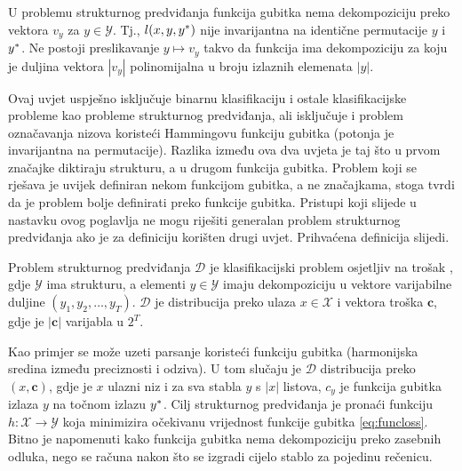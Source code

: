 \begin{condition}

  U problemu strukturnog predviđanja funkcija gubitka nema dekompoziciju preko
  vektora $v_y$ za $y \in \mathcal{Y}$. Tj., $l(x, y, y\ssymbol{1})$ nije
  invarijantna na identične permutacije $y$ i $y\ssymbol{1}$. Ne postoji
  preslikavanje $y \mapsto v_y$ takvo da funkcija ima dekompoziciju za koju je
  duljina vektora $|v_y|$ polinomijalna u broju izlaznih elemenata $|y|$.

\end{condition}

\noindent
Ovaj uvjet uspješno isključuje binarnu klasifikaciju i ostale klasifikacijske
probleme kao probleme strukturnog predviđanja, ali isključuje i problem
označavanja nizova koristeći Hammingovu funkciju gubitka (potonja je
invarijantna na permutacije). Razlika između ova dva uvjeta je taj što u prvom
značajke diktiraju strukturu, a u drugom funkcija gubitka. Problem koji se
rješava je uvijek definiran nekom funkcijom gubitka, a ne značajkama, stoga
\citeauthor{daume06thesis} tvrdi da je problem bolje definirati preko funkcije
gubitka. Pristupi koji slijede u nastavku ovog poglavlja ne mogu riješiti
generalan problem strukturnog predviđanja ako je za definiciju korišten drugi
uvjet. Prihvaćena definicija slijedi.

\begin{definition} \label{def:jointlearn}

  Problem strukturnog predviđanja $\mathcal{D}$ je klasifikacijski problem
  osjetljiv na trošak , gdje
  $\mathcal{Y}$ ima strukturu, a elementi $y \in \mathcal{Y}$ imaju
  dekompoziciju u vektore varijabilne duljine $(y_1, y_2, \ldots, y_T)$.
  $\mathcal{D}$ je distribucija preko ulaza $x \in \mathcal{X}$ i vektora troška
  $\mathbf{c}$, gdje je $|\mathbf{c}|$ varijabla u $2^T$.

\end{definition}

\noindent
Kao primjer se može uzeti parsanje koristeći funkciju gubitka
 (harmonijska sredina između preciznosti i odziva). U tom
slučaju je $\mathcal{D}$ distribucija preko $(x, \mathbf{c})$, gdje je $x$
ulazni niz i za sva stabla $y$ s $|x|$ listova, $c_y$ je funkcija gubitka
 izlaza $y$ na točnom izlazu $y\ssymbol{1}$. Cilj
strukturnog predviđanja je pronaći funkciju $h: \mathcal{X} \rightarrow
\mathcal{Y}$ koja minimizira očekivanu vrijednost funkcije gubitka
\ref{eq:funcloss}. Bitno je napomenuti kako funkcija gubitka
 nema dekompoziciju preko zasebnih odluka, nego se računa
nakon što se izgradi cijelo stablo za pojedinu rečenicu.

